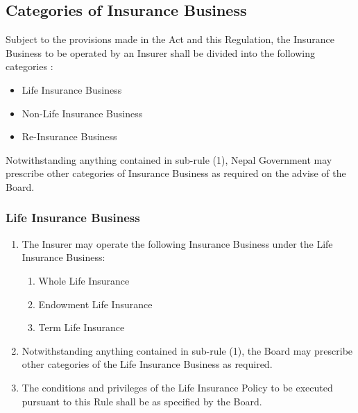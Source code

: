 \subsection{Categories of Insurance Business}
Subject to the provisions made in the Act and this Regulation, the Insurance Business to be operated by an Insurer shall be divided into the following categories :
\begin{itemize}
	\item Life Insurance Business
	\item Non-Life Insurance Business
	\item Re-Insurance Business
\end{itemize}
Notwithstanding anything contained in sub-rule (1), Nepal Government may prescribe other categories of Insurance Business as required on the advise of the Board.
%
\subsubsection{Life Insurance Business}
\begin{enumerate}
	\item The Insurer may operate the following Insurance Business under the Life Insurance Business:
	\begin{enumerate}
		\item Whole Life Insurance
		\item Endowment Life Insurance
		\item Term Life Insurance
	\end{enumerate}
	\item Notwithstanding anything contained in sub-rule (1), the Board may prescribe other
	categories of the Life Insurance Business as required.
	\item  The conditions and privileges of the Life Insurance Policy to be executed pursuant to this
	Rule shall be as specified by the Board.
\end{enumerate}
%
